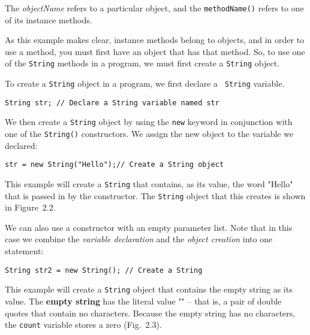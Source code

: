 \noindent The {\it objectName} refers to a particular object,
and the {\tt methodName()} refers to one of its instance methods.

As this example makes clear, instance methods belong to objects, and
in order to use a method, you must first have an object that has that
method. So, to use one of the {\tt String} methods in a program, we must
first create a {\tt String} object. 

To create a {\tt String} object in a program, we first declare a {\tt
String} variable.

\begin{jjjlisting}
\begin{lstlisting}
String str; // Declare a String variable named str
\end{lstlisting}
\end{jjjlisting}

\noindent We then create a {\tt String} object by using
the {\tt new} keyword in conjunction with one of the {\tt String()}
constructors. We assign the new object to the variable we declared:

\begin{jjjlisting}
\begin{lstlisting}
str = new String("Hello");// Create a String object
\end{lstlisting}
\end{jjjlisting}

\noindent This example will create a {\tt String} that
contains, as its value, the word "Hello" that is passed in by the
constructor.  The {\tt String} object that this creates is shown in
Figure~2.2.


We can also use a constructor with an empty parameter list.
Note that in this case we combine the {\it variable declaration}
and the {\it object creation} into one statement:

\begin{jjjlisting}
\begin{lstlisting}
String str2 = new String(); // Create a String
\end{lstlisting}
\end{jjjlisting}

\noindent This example will create a {\tt String} object
that contains the empty string as its value.  The {\bf empty string}
has the literal value "" -- that is, a pair of double quotes that
contain no characters. Because the empty string has no characters,
the {\tt count} variable stores a zero (Fig.~2.3).

